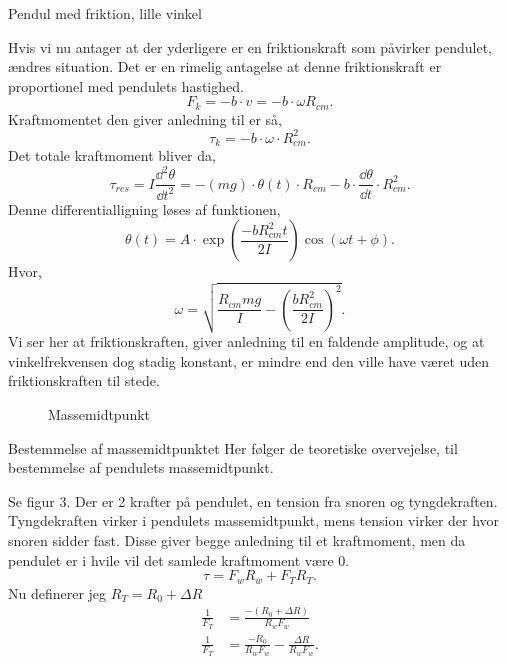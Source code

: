 \begin{subexercise}{Pendul med friktion, lille vinkel}

\end{subexercise}
\begin{solution}
Hvis vi nu antager at der yderligere er en friktionskraft som påvirker pendulet, ændres situation. Det er en rimelig antagelse at denne friktionskraft er proportionel med pendulets hastighed.
\[
F_k = -b\cdot v = -b\cdot \omega R_{cm} 
.\] 
Kraftmomentet den giver anledning til er så,
\[
\tau_k = -b \cdot \omega \cdot R_{cm}^2
.\]
Det totale kraftmoment bliver da,
\[
	\tau_{res} = I \frac{\dd^2 \theta}{\dd t^2} = -(mg)\cdot \theta (t) \cdot R_{cm} - b\cdot \frac{\dd \theta}{\dd t} \cdot R_{cm}^2
.\]
Denne differentialligning løses af funktionen,
\[
	\theta (t) = A\cdot \exp\left( \frac{-bR_{cm}^2t}{2I}\right)\cos(\omega t+ \phi)
.\] 
Hvor,
\[
\omega = \sqrt{\frac{R_{cm}mg}{I}- \left( \frac{bR_{cm}^2}{2I} \right) ^2} 
.\]
Vi ser her at friktionskraften, giver anledning til en faldende amplitude, og at vinkelfrekvensen dog stadig konstant, er mindre end den ville have været uden friktionskraften til stede.
\end{solution}
\begin{figure}[ht]
    \centering
    \caption{Massemidtpunkt}
    \label{fig:massemidtpunkt}
\end{figure}
\newpage
\begin{subexercise}{Bestemmelse af massemidtpunktet}
Her følger de teoretiske overvejelse, til bestemmelse af pendulets massemidtpunkt.
\end{subexercise}\newline
Se figur 3. Der er 2 krafter på pendulet, en tension fra snoren og tyngdekraften. Tyngdekraften virker i pendulets massemidtpunkt, mens tension virker der hvor snoren sidder fast. Disse giver begge anledning til et kraftmoment, men da pendulet er i hvile vil det samlede kraftmoment være 0.
\[
\tau = F_wR_w + F_TR_T
.\] 
Nu definerer jeg $R_T = R_0 + \Delta R$
\begin{align*}
	\frac{1}{F_T}&= \frac{-\left( R_0+\Delta R \right) }{R_wF_w} \\
	\frac{1}{F_T}&= \frac{-R_0}{R_wF_w}-\frac{\Delta R}{R_wF_w}
.\end{align*} 

